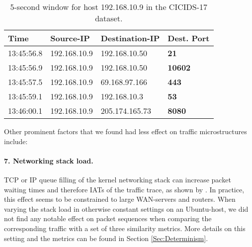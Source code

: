 \begin{table}[h!]
\centering
\begin{tabular}{l|l|l|>{\bfseries}l}
Time& Source-IP &Destination-IP& Dest. Port\\ \hline
13:45:56.8 & 192.168.10.9 & 192.168.10.50 &    21 \\ \hline
13:45:56.9 & 192.168.10.9 & 192.168.10.50 &  10602\\ \hline
13:45:57.5 & 192.168.10.9 & 69.168.97.166 &   443\\ \hline
13:45:59.1 & 192.168.10.9 &  192.168.10.3 &    53\\ \hline
13:46:00.1 & 192.168.10.9 & 205.174.165.73 &   8080\\ \hline
\end{tabular}
\vspace{0.2cm}
\caption{5-second window for host 192.168.10.9 in the CICIDS-17 dataset.}\label{Tab:Sess}
\vspace{-1cm}
\end{table}


Other prominent factors that we found had less effect on traffic microstructures include:

\paragraph{7. Networking stack load.}
TCP or IP queue filling of the kernel networking stack can increase packet waiting times and therefore IATs of the traffic trace, as shown by \cite{sequeira2013influence}. In practice, this effect seems to be constrained to large WAN-servers and routers. When varying the stack load in otherwise constant settings on an Ubuntu-host, we did not find any notable effect on packet sequences when comparing the corresponding traffic with a set of three similarity metrics. More details on this setting and the metrics can be found in Section \ref{Sec:Determinism}.




